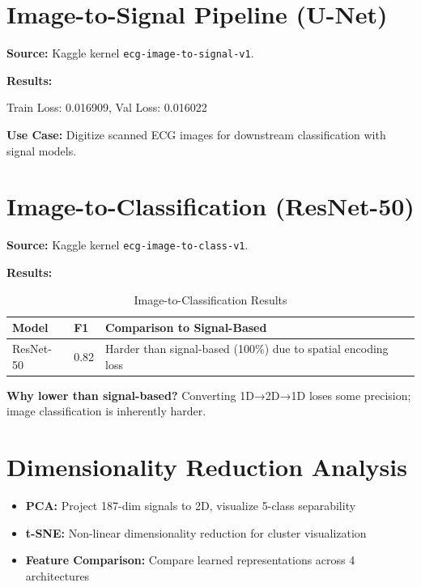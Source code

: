 \section{Image-to-Signal Pipeline (U-Net)}
\textbf{Source:} Kaggle kernel \texttt{ecg-image-to-signal-v1}.

\textbf{Results:}

Train Loss: 0.016909, Val Loss: 0.016022

\textbf{Use Case:} Digitize scanned ECG images for downstream classification with signal models.

\section{Image-to-Classification (ResNet-50)}
\textbf{Source:} Kaggle kernel \texttt{ecg-image-to-class-v1}.

\textbf{Results:}

\begin{table}[H]
\centering
\caption{Image-to-Classification Results}
\label{tab:image_class_results}
\begin{tabular}{|l|l|l|l|}
\hline
\textbf{Model} & \textbf{F1} & \textbf{Comparison to Signal-Based} \\
\hline
ResNet-50 & 0.82 & Harder than signal-based (100\%) due to spatial encoding loss \\
\hline
\end{tabular}
\end{table}

\textbf{Why lower than signal-based?} Converting 1D→2D→1D loses some precision; image classification is inherently harder.

\section{Dimensionality Reduction Analysis}

\begin{itemize}
    \item \textbf{PCA:} Project 187-dim signals to 2D, visualize 5-class separability
    \item \textbf{t-SNE:} Non-linear dimensionality reduction for cluster visualization
    \item \textbf{Feature Comparison:} Compare learned representations across 4 architectures
\end{itemize}
